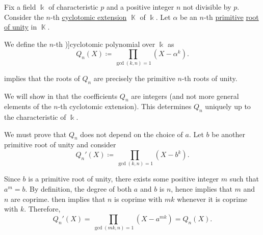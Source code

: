 \begin{definition}\label{def:cyclotomic_polynomial}
  Fix a field \( \Bbbk \) of characteristic \( p \) and a positive integer \( n \) not divisible by \( p \). Consider the \( n \)-th \hyperref[def:cyclotomic_extension]{cyclotomic extension} \( \BbbK \) of \( \Bbbk \). Let \( \alpha \) be an \( n \)-th \hyperref[def:primitive_root_of_unity]{primitive} \hyperref[def:root_of_unity]{root of unity} in \( \BbbK \).

  We define the \( n \)-th \term[ru=круговой / циклотомический (многочлен) (\cite[130]{Тыртышников2017Алгебра})]{cyclotomic polynomial} over \( \Bbbk \) as
  \begin{equation}\label{eq:def:cyclotomic_polynomial}
    Q_n(X) \coloneqq \prod_{\gcd(k, n) = 1} (X - \alpha^k).
  \end{equation}
\end{definition}
\begin{comments}
  \item {} implies that the roots of \( Q_n \) are precisely the primitive \( n \)-th roots of unity.
  \item We will show in  that the coefficients \( Q_n \) are integers (and not more general elements of the \( n \)-th cyclotomic extension). This determines \( Q_n \) uniquely up to the characteristic of \( \Bbbk \).
\end{comments}
\begin{defproof}
  We must prove that \( Q_n \) does not depend on the choice of \( a \). Let \( b \) be another primitive root of unity and consider
  \begin{equation*}
    Q_n'(X) \coloneqq \prod_{\gcd(k, n) = 1} (X - b^k).
  \end{equation*}

  Since \( b \) is a primitive root of unity, there exists some positive integer \( m \) such that \( a^m = b \). By definition, the degree of both \( a \) and \( b \) is \( n \), hence  implies that \( m \) and \( n \) are coprime.  then implies that \( n \) is coprime with \( mk \) whenever it is coprime with \( k \). Therefore,
  \begin{equation*}
    Q_n'(X) = \prod_{\gcd(mk, n) = 1} (X - a^{mk}) = Q_n(X).
  \end{equation*}
\end{defproof}

